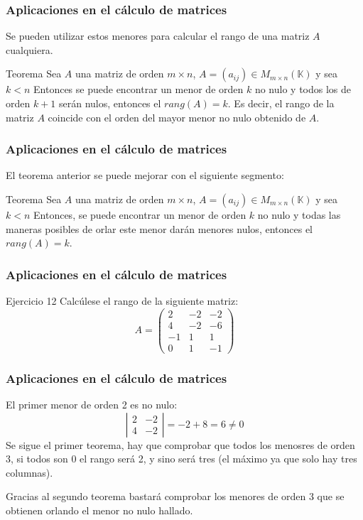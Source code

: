 \documentclass[aspectratio=169]{beamer}
\begin{document}
    
    \begin{frame}
  \frametitle{Aplicaciones en el c\'alculo de matrices}
Se pueden utilizar estos menores para calcular el rango de una matriz $A$ cualquiera.
     \begin{block}{Teorema}
Sea $A$ una matriz de orden $m\times n$, $A=(a_{ij})\in M_{m\times n}(\mathbb{K})$ y sea $k<n$
Entonces se puede encontrar un menor de orden $k$ no nulo y todos los de orden $k+1$ ser\'an nulos, entonces el $rang(A)=k$. Es decir, el rango de la matriz $A$ coincide con el orden del mayor menor no nulo obtenido de $A$.
\end{block}
\end{frame}  
  
     \begin{frame}
  \frametitle{Aplicaciones en el c\'alculo de matrices}
El teorema anterior se puede mejorar con el siguiente segmento:
     \begin{block}{Teorema}
Sea $A$ una matriz de orden $m\times n$, $A=(a_{ij})\in M_{m\times n}(\mathbb{K})$ y sea $k<n$
Entonces, se puede encontrar un menor de orden $k$ no nulo y todas las maneras posibles de orlar este menor dar\'an menores nulos, entonces el $rang(A)=k$.
\end{block}
\end{frame}   
  
  
     \begin{frame}
  \frametitle{Aplicaciones en el c\'alculo de matrices}
     \begin{block}{Ejercicio 12}
Calc\'ulese el rango de la siguiente matriz:
\[A = \left(\begin{array}{ccc}2 & -2 & -2 \\4 & -2 & -6 \\-1 & 1 & 1 \\0 & 1 & -1\end{array}\right)\]
\end{block}
\end{frame}  

    \begin{frame}
  \frametitle{Aplicaciones en el c\'alculo de matrices}
El primer menor de orden 2 es no nulo:
\[\left|\begin{array}{cc}2 & -2  \\4 & -2 \end{array}\right| = -2+8 = 6\neq0\]
Se sigue el primer teorema, hay que comprobar que todos los menosres de orden 3, si todos son 0 el rango ser\'a 2, y sino ser\'a tres (el m\'aximo ya que solo hay tres columnas).

Gracias al segundo teorema bastar\'a comprobar los menores de orden 3 que se obtienen orlando el menor no nulo hallado. 
\end{frame}  
\end{document}
